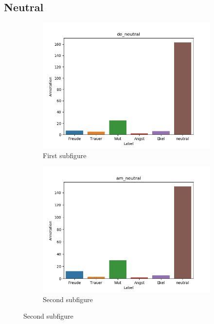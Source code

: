 \documentclass[11pt,a4paper,headsepline,twoside,toc=bibliography]{scrreprt}
\begin{document}
\subsection{Neutral}

\begin{figure}[t!] %
	\begin{subfigure}{0.48\textwidth}
		\includegraphics[width=\linewidth]{plots/de_neutral.png}
		\caption{First subfigure} \label{fig:de_s}
	\end{subfigure}\hspace*{\fill}
	\begin{subfigure}{0.48\textwidth}
		\includegraphics[width=\linewidth]{plots/am_neutral.png}
		\caption{Second subfigure} \label{fig:am_s}
	\end{subfigure}
	

\end{figure}
\end{document}

